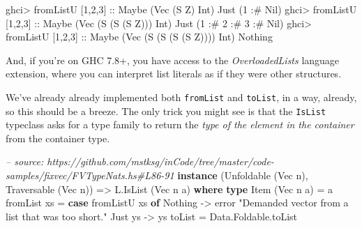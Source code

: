 \documentclass[]{article}
\newenvironment{Shaded}{}{}
\newcommand{\KeywordTok}[1]{\textcolor[rgb]{0.00,0.44,0.13}{\textbf{{#1}}}}
\newcommand{\DataTypeTok}[1]{\textcolor[rgb]{0.56,0.13,0.00}{{#1}}}
\newcommand{\DecValTok}[1]{\textcolor[rgb]{0.25,0.63,0.44}{{#1}}}
\newcommand{\StringTok}[1]{\textcolor[rgb]{0.25,0.44,0.63}{{#1}}}
\newcommand{\CommentTok}[1]{\textcolor[rgb]{0.38,0.63,0.69}{\textit{{#1}}}}
\newcommand{\OtherTok}[1]{\textcolor[rgb]{0.00,0.44,0.13}{{#1}}}
\newcommand{\FunctionTok}[1]{\textcolor[rgb]{0.02,0.16,0.49}{{#1}}}
\newcommand{\NormalTok}[1]{{#1}}
\begin{document}
\begin{Shaded}
\begin{Highlighting}[]
\NormalTok{ghci}\FunctionTok{>} \NormalTok{fromListU [}\DecValTok{1}\NormalTok{,}\DecValTok{2}\NormalTok{,}\DecValTok{3}\NormalTok{]}\OtherTok{ ::} \DataTypeTok{Maybe} \NormalTok{(}\DataTypeTok{Vec} \NormalTok{(}\DataTypeTok{S} \DataTypeTok{Z}\NormalTok{) }\DataTypeTok{Int}\NormalTok{)}
\DataTypeTok{Just} \NormalTok{(}\DecValTok{1} \FunctionTok{:#} \DataTypeTok{Nil}\NormalTok{)}
\NormalTok{ghci}\FunctionTok{>} \NormalTok{fromListU [}\DecValTok{1}\NormalTok{,}\DecValTok{2}\NormalTok{,}\DecValTok{3}\NormalTok{]}\OtherTok{ ::} \DataTypeTok{Maybe} \NormalTok{(}\DataTypeTok{Vec} \NormalTok{(}\DataTypeTok{S} \NormalTok{(}\DataTypeTok{S} \NormalTok{(}\DataTypeTok{S} \DataTypeTok{Z}\NormalTok{))) }\DataTypeTok{Int}\NormalTok{)}
\DataTypeTok{Just} \NormalTok{(}\DecValTok{1} \FunctionTok{:#} \DecValTok{2} \FunctionTok{:#} \DecValTok{3} \FunctionTok{:#} \DataTypeTok{Nil}\NormalTok{)}
\NormalTok{ghci}\FunctionTok{>} \NormalTok{fromListU [}\DecValTok{1}\NormalTok{,}\DecValTok{2}\NormalTok{,}\DecValTok{3}\NormalTok{]}\OtherTok{ ::} \DataTypeTok{Maybe} \NormalTok{(}\DataTypeTok{Vec} \NormalTok{(}\DataTypeTok{S} \NormalTok{(}\DataTypeTok{S} \NormalTok{(}\DataTypeTok{S} \NormalTok{(}\DataTypeTok{S} \DataTypeTok{Z}\NormalTok{)))) }\DataTypeTok{Int}\NormalTok{)}
\DataTypeTok{Nothing}
\end{Highlighting}
\end{Shaded}

And, if you're on GHC 7.8+, you have access to the
\emph{OverloadedLists} language extension, where you can interpret list
literals as if they were other structures.

We've already already implemented both \texttt{fromList} and
\texttt{toList}, in a way, already, so this should be a breeze. The only
trick you might see is that the \texttt{IsList} typeclass asks for a
type family to return the \emph{type of the element in the container}
from the container type.

\begin{Shaded}
\begin{Highlighting}[]
\CommentTok{-- source: https://github.com/mstksg/inCode/tree/master/code-samples/fixvec/FVTypeNats.hs#L86-91}
\KeywordTok{instance} \NormalTok{(}\DataTypeTok{Unfoldable} \NormalTok{(}\DataTypeTok{Vec} \NormalTok{n), }\DataTypeTok{Traversable} \NormalTok{(}\DataTypeTok{Vec} \NormalTok{n)) }\OtherTok{=>} \DataTypeTok{L.IsList} \NormalTok{(}\DataTypeTok{Vec} \NormalTok{n a) }\KeywordTok{where}
    \KeywordTok{type} \DataTypeTok{Item} \NormalTok{(}\DataTypeTok{Vec} \NormalTok{n a) }\FunctionTok{=} \NormalTok{a}
    \NormalTok{fromList xs }\FunctionTok{=} \KeywordTok{case} \NormalTok{fromListU xs }\KeywordTok{of}
                    \DataTypeTok{Nothing} \OtherTok{->} \NormalTok{error }\StringTok{"Demanded vector from a list that was too short."}
                    \DataTypeTok{Just} \NormalTok{ys }\OtherTok{->} \NormalTok{ys}
    \NormalTok{toList      }\FunctionTok{=} \NormalTok{Data.Foldable.toList}
\end{Highlighting}
\end{Shaded}
\end{document}
